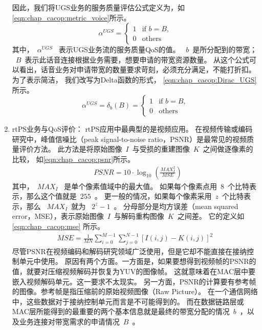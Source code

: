 \begin{enumerate}[(1)]
因此，我们将UGS业务的服务质量评估公式定义为，如\eqref{eqn:chap_cacop:metric_voice}所示。
\begin{equation}
\label{eqn:chap_cacop:metric_voice}
\alpha^{UGS}=
\begin{cases}
1 & \text{if $b=B$,}\\
0 &\text{others}
\end{cases}
\end{equation}
其中，~$\alpha^{UGS}$~ 表示UGS业务流的服务质量QoS的值。
~$b$~是所分配到的带宽；
~$B$~表示此话音连接根据业务需要，想要申请的带宽资源数量。
从这个公式可以看出，话音业务对申请带宽的数量要求苛刻，必须充分满足，不能打折扣。
为了表示简洁，
我们改写为Delta函数的形式，
\eqref{eqn:chap_cacop:Dirac_UGS}所示。
%
\begin{equation}
\label{eqn:chap_cacop:Dirac_UGS}
\alpha^{UGS}= \delta_{b}(B) = 
\begin{cases}
1 & \text{if $b= B$,}\\
0 &\text{others}
\end{cases}
\end{equation}

\item rtPS业务与QoS评价： 
rtPS应用中最典型的是视频应用。
在视频传输或编码研究中，峰值信噪比（peak signal-to-noise ratio，PSNR）是最常见的视频质量评价方法。
此方法是将原始图像~$I$~与受损的重建图像~$K$~之间做逐像素的比较，
如\eqref{eqn:chap_cacop:psnr}所示。 
%
\begin{align}
\label{eqn:chap_cacop:psnr}
& PSNR = 10 \cdot \log_{10} \left( \frac{MAX_I^2}{MSE} \right)
\end{align}
其中，~$MAX_I$~ 是单个像素值域中的最大值。
如果每个像素点用~$8$~个比特表示，那么这个值就是~$255$~。
更一般的情况，如果每个像素采用~$z$~个比特表示，那么 ~$MAX_I$~就为 ~$2^z - 1$~。
分母部分是均方误差（mean squared error，MSE），表示原始图像~$I$~与解码重构图像~$K$~之间差。
它的定义如 \eqref{eqn:chap_cacop:mse} 所示。
\begin{align}
\label{eqn:chap_cacop:mse}
MSE = \frac{1}{MN} \sum_{i=0}^{M-1}\sum_{j=0}^{N-1} \left[I(i,j) - K(i,j)\right]^2 
\end{align}
尽管PSNR在视频编码和解码研究领域广泛使用，但是它却不能直接在接纳控制单元中使用。
原因有两个方面。一方面是，如果要想得到视频帧的PSNR的值，就要对压缩视频解码并恢复为YUV的图像帧。
这就意味着在MAC层中要嵌入视频解码单元。这一要求不太现实。
另一方面，PSNR的计算要有参考帧的图像。参考帧是指压缩前的原始视频图像（Raw Picture）。
在一个通信网络中，这些数据对于接纳控制单元而言是不可能得到的。
而在数据链路层或MAC层所能得到的最重要的两个基本信息就是最终的带宽分配的情况~$b$~，以及业务连接对带宽需求的申请情况~$B$~。


\end{enumerate}
